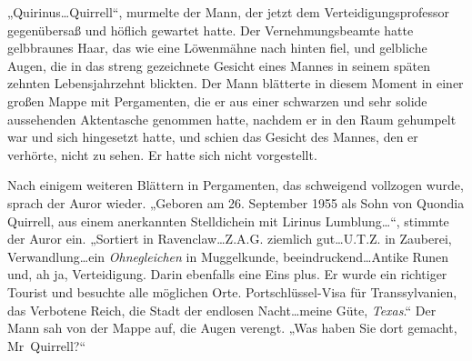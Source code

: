 „Quirinus…Quirrell“, murmelte der Mann, der jetzt dem Verteidigungsprofessor gegenübersaß und höflich gewartet hatte. Der Vernehmungsbeamte hatte gelbbraunes Haar, das wie eine Löwenmähne nach hinten fiel, und gelbliche Augen, die in das streng gezeichnete Gesicht eines Mannes in seinem späten zehnten Lebensjahrzehnt blickten. Der Mann blätterte in diesem Moment in einer großen Mappe mit Pergamenten, die er aus einer schwarzen und sehr solide aussehenden Aktentasche genommen hatte, nachdem er in den Raum gehumpelt war und sich hingesetzt hatte, und schien das Gesicht des Mannes, den er verhörte, nicht zu sehen. Er hatte sich nicht vorgestellt.

Nach einigem weiteren Blättern in Pergamenten, das schweigend vollzogen wurde, sprach der Auror wieder.
„Geboren am 26. September 1955 als Sohn von Quondia Quirrell, aus einem anerkannten Stelldichein mit Lirinus Lumblung…“, stimmte der Auror ein. „Sortiert in Ravenclaw…Z.A.G. ziemlich gut…U.T.Z. in Zauberei, Verwandlung…ein \emph{Ohnegleichen} in Muggelkunde, beeindruckend…Antike Runen und, ah ja, Verteidigung. Darin ebenfalls eine Eins plus. Er wurde ein richtiger Tourist und besuchte alle möglichen Orte. Portschlüssel-Visa für Transsylvanien, das Verbotene Reich, die Stadt der endlosen Nacht…meine Güte, \emph{Texas}.“
Der Mann sah von der Mappe auf, die Augen verengt.
„Was haben Sie dort gemacht, Mr~Quirrell?“

